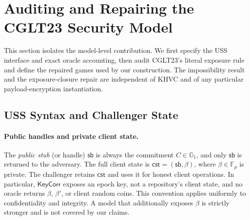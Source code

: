 \section{Auditing and Repairing the CGLT23 Security Model}
\label{sec:model-repair}

This section isolates the model-level contribution. We first specify the USS interface and exact oracle accounting, then audit CGLT23's literal exposure rule and define the repaired games used by our construction. The impossibility result and the exposure-closure repair are independent of KHVC and of any particular payload-encryption instantiation.

\subsection{USS Syntax and Challenger State}

\paragraph{Public handles and private client state.}
The \emph{public stub} (or handle) $\mathsf{sb}$ is always the commitment $C\in\mathbb G_1$, and only $\mathsf{sb}$ is returned to the adversary. The full client state is $\mathsf{cst}=(\mathsf{sb},\beta)$, where $\beta\in\mathbb F_p$ is private. The challenger retains $\mathsf{cst}$ and uses it for honest client operations. In particular, $\mathsf{KeyCorr}$ exposes an epoch key, not a repository's client state, and no oracle returns $\beta$, $\beta'$, or client random coins. This convention applies uniformly to confidentiality and integrity. A model that additionally exposes $\beta$ is strictly stronger and is not covered by our claims.

